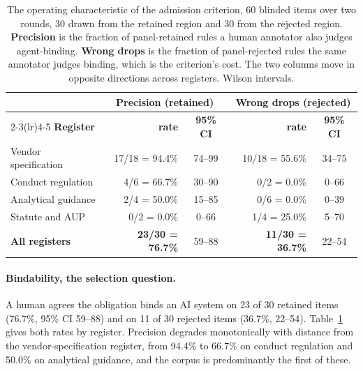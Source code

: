 \documentclass{article}
\begin{document}
\begin{table}[h]
\centering
\small
\setlength{\tabcolsep}{4pt}
\caption{The operating characteristic of the admission criterion, 60 blinded items over two
rounds, 30 drawn from the retained region and 30 from the rejected region. \textbf{Precision} is
the fraction of panel-retained rules a human annotator also judges agent-binding.
\textbf{Wrong drops} is the fraction of panel-rejected rules the same annotator judges binding,
which is the criterion's cost. The two columns move in opposite directions across registers.
Wilson intervals.}
\label{tab:calibration}
\begin{tabular}{@{}lrcrc@{}}
\toprule
& \multicolumn{2}{c}{\textbf{Precision} (retained)} & \multicolumn{2}{c}{\textbf{Wrong drops} (rejected)} \\
\cmidrule(lr){2-3}\cmidrule(lr){4-5}
\textbf{Register} & \textbf{rate} & \textbf{95\% CI} & \textbf{rate} & \textbf{95\% CI} \\
\midrule
Vendor specification & 17/18 = 94.4\% & 74--99 & 10/18 = 55.6\% & 34--75 \\
Conduct regulation & 4/6 = 66.7\% & 30--90 & 0/2 = 0.0\% & 0--66 \\
Analytical guidance & 2/4 = 50.0\% & 15--85 & 0/6 = 0.0\% & 0--39 \\
Statute and AUP & 0/2 = 0.0\% & 0--66 & 1/4 = 25.0\% & 5--70 \\
\midrule
\textbf{All registers} & \textbf{23/30 = 76.7\%} & 59--88 & \textbf{11/30 = 36.7\%} & 22--54 \\
\bottomrule
\end{tabular}
\end{table}

\paragraph{Bindability, the selection question.}
A human agrees the obligation binds an AI system on 23 of 30 retained items (76.7\%, 95\% CI
59--88) and on 11 of 30 rejected items (36.7\%, 22--54). Table~\ref{tab:calibration} gives both
rates by register. Precision degrades monotonically with distance from the
vendor-specification register, from 94.4\% to 66.7\% on conduct regulation and 50.0\% on
analytical guidance, and the corpus is predominantly the first of these.
\end{document}
